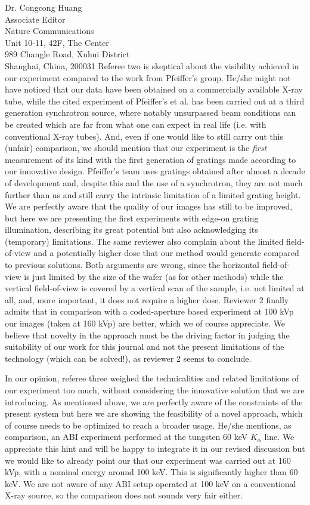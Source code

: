 \documentclass[a4paper,english]{scrlttr2}
\begin{document}
\begin{letter}{Dr. Congcong Huang\\

Associate Editor\\
Nature Communications \\

Unit 10-11, 42F, The Center\\
989 Changle Road, Xuhui District\\
Shanghai, China, 200031}
Referee two is skeptical about the visibility achieved in our experiment
compared to the work from Pfeiffer's group. He/she might not have noticed
that our data have been obtained on a commercially available X-ray tube,
while the cited experiment of Pfeiffer's et al. has been carried out at a
    third generation synchrotron source, where notably unsurpassed beam
    conditions can be created which are far from what one can expect in real
    life (i.e. with conventional X-ray tubes). And, even if one would like
    to still carry out this (unfair) comparison, we should mention that our
    experiment is the \emph{first} measurement of its kind with the first
    generation of gratings made according to our innovative design.
    Pfeiffer's team uses gratings obtained after almost a decade of
    development and, despite this and the use of a synchrotron, they are not
    much further than us and still carry the intrinsic limitation of a
    limited grating height. We are perfectly aware that the quality of our
    images has still to be improved, but here we are presenting the first
    experiments with edge-on grating illumination, describing its great
    potential but also acknowledging its (temporary) limitations. The same
    reviewer also complain about the limited field-of-view and a potentially higher
    dose that our method would generate compared to previous solutions. Both
    arguments are wrong, since the horizontal field-of-view is just limited by the
    size of the wafer (as for other methods) while the vertical
    field-of-view is
    covered by a vertical scan of the sample, i.e. not limited at all, and,
    more important, it does not require a higher dose. Reviewer 2 finally
    admits that in comparison with a coded-aperture based experiment at 100
    kVp our images (taken at 160 kVp) are better, which we of course
    appreciate. We believe that novelty in the approach must be the driving
    factor in judging the suitability of our work for this journal and not
    the present limitations of the technology (which can be solved!), as
    reviewer 2 seems to conclude.

In our opinion, referee three weighed the technicalities and related
limitations of our experiment too much, without considering the innovative
solution that we are introducing. As mentioned above, we are perfectly aware
of the constraints of the present system but here we are showing the
feasibility of a novel approach, which of course needs to be optimized to
reach a broader usage. He/she mentions, as comparison, an ABI experiment
performed at the tungsten 60 keV $K_\alpha$ line. We appreciate this hint and
will be happy to integrate it in our revised discussion but we would like to
already point our that our experiment was carried out at 160 kVp, with a
nominal energy around 100 keV. This is significantly higher than 60 keV. We
are not aware of any ABI setup operated at 100 keV on a conventional X-ray
source, so the comparison does not sounds very fair either.


\end{letter}
\end{document}
